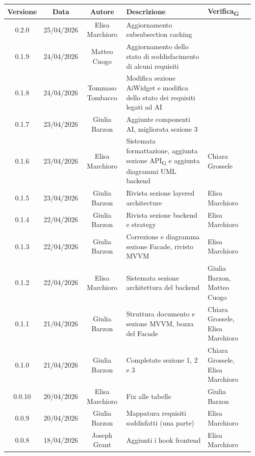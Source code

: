 \documentclass[11pt,a4paper]{article}
\newcommand{\gls}[1]{#1\textsubscript{G}}
\begin{document}
\begin{table}[H]
    \centering          
    \begin{tabular}{|c|c|c|>{\raggedright\arraybackslash}p{}|p{}|}
        \hline
        \textbf{Versione} & \textbf{Data} & \textbf{Autore} & \textbf{Descrizione} & \textbf{\gls{Verifica}} \\
        \hline
        0.2.0 & 25/04/2026 & Elisa Marchioro & Aggiornamento subsubsection caching & \\
        \hline
        0.1.9 & 24/04/2026 & Matteo Cuogo & Aggiornamento dello stato di soddisfacimento di alcuni requisiti & \\
        \hline
        0.1.8 & 24/04/2026 & Tommaso Tombacco & Modifica sezione AiWidget e modifica dello stato dei requisiti legati ad AI & \\
        \hline
        0.1.7 & 23/04/2026 & Giulia Barzon & Aggiunte componenti AI, migliorata sezione 3 & \\
        \hline
        0.1.6 & 23/04/2026 & Elisa Marchioro & Sistemata formattazione, aggiunta sezione \gls{API} e aggiunta diagrammi UML backend & Chiara Grossele \\
        \hline
        0.1.5 & 23/04/2026 & Giulia Barzon & Rivista sezione layered architecture & Elisa Marchioro\\
        \hline
        0.1.4 & 22/04/2026 & Giulia Barzon & Rivista sezione backend e strategy & Elisa Marchioro\\
        \hline
        0.1.3 & 22/04/2026 & Giulia Barzon & Correzione e diagramma sezione Facade, rivisto MVVM & Elisa Marchioro\\
        \hline
        0.1.2 & 22/04/2026 & Elisa Marchioro & Sistemata sezione architettura del backend & Giulia Barzon, Matteo Cuogo\\
        \hline
        0.1.1 & 21/04/2026 & Giulia Barzon & Struttura documento e sezione MVVM, bozza del Facade & Chiara Grossele, Elisa Marchioro\\
        \hline
        0.1.0 & 21/04/2026 & Giulia Barzon & Completate sezione 1, 2 e 3 & Chiara Grossele, Elisa Marchioro\\
        \hline
        0.0.10 & 20/04/2026 & Elisa Marchioro & Fix alle tabelle & Giulia Barzon\\
        \hline
        0.0.9 & 20/04/2026 & Giulia Barzon & Mappatura requisiti soddisfatti (una parte) & Elisa Marchioro\\
        \hline
        0.0.8 & 18/04/2026 & Joseph Grant & Aggiunti i hook frontend & Elisa Marchioro\\

\end{tabular}
\end{table}
\end{document}
